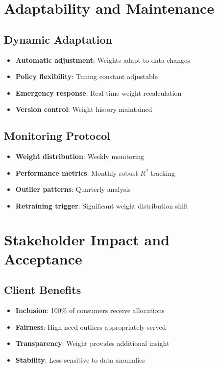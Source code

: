 \section{Adaptability and Maintenance}

\subsection{Dynamic Adaptation}

\begin{itemize}
    \item \textbf{Automatic adjustment}: Weights adapt to data changes
    \item \textbf{Policy flexibility}: Tuning constant adjustable
    \item \textbf{Emergency response}: Real-time weight recalculation
    \item \textbf{Version control}: Weight history maintained
\end{itemize}

\subsection{Monitoring Protocol}

\begin{itemize}
    \item \textbf{Weight distribution}: Weekly monitoring
    \item \textbf{Performance metrics}: Monthly robust $R^2$ tracking
    \item \textbf{Outlier patterns}: Quarterly analysis
    \item \textbf{Retraining trigger}: Significant weight distribution shift
\end{itemize}

\section{Stakeholder Impact and Acceptance}

\subsection{Client Benefits}

\begin{itemize}
    \item \textbf{Inclusion}: 100\% of consumers receive allocations
    \item \textbf{Fairness}: High-need outliers appropriately served
    \item \textbf{Transparency}: Weight provides additional insight
    \item \textbf{Stability}: Less sensitive to data anomalies
\end{itemize}


